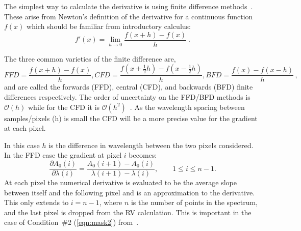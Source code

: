 The simplest way to calculate the derivative is using finite difference methods~\citep{quarteroni_numerical_2000}.
These arise from Newton's definition of the derivative for a continuous function \(f(x)\) which should be familiar from introductory calculus:
\[f'(x) = \lim_{h \to 0} \frac{f(x+h)-f(x)}{h}~.\]

The three common varieties of the finite difference are,
\begin{equation}
{FFD} = \frac{f(x+h)-f(x)}{h}, {CFD}=\frac{f(x+\frac{1}{2}h)-f(x-\frac{1}{2}h)}{h}, {BFD}=\frac{f(x)-f(x-h)}{h}\,,
\end{equation}
and are called the forwards ({FFD}), central ({CFD}), and backwards ({BFD}) finite differences respectively.
The order of uncertainty on the {FFD}/{BFD} methods is \(\mathcal{O}(h)\) while for the {CFD} it is \(\mathcal{O}({h}^{2})\)~\citep{quarteroni_numerical_2000}.
As the wavelength spacing between samples/pixels (h) is small the {CFD} will be a more precise value for the gradient at each pixel.

In this case \(h\) is the difference in wavelength between the two pixels considered.
In the {FFD} case the gradient at pixel \(i\) becomes:
\begin{equation}
\frac{\partial {A}_{0}(i)}{\partial\lambda(i)} = \frac{{A}_{0}(i+1) - {A}_{0}(i)}{\lambda(i+1)-\lambda(i)}, \hspace{2em} 1 \leq i \leq n-1.
\label{eqn:ffd_precision}
\end{equation}
At each pixel the numerical derivative is evaluated to be the average slope between itself and the following pixel and is an approximation to the derivative.
This only extends to \(i= n-1\), where \(n\) is the number of points in the spectrum, and the last pixel is dropped from the {RV} calculation.
This is important in the case of Condition~\#2 (\cref{eqn:mask2}) from~\citet{figueira_radial_2016}.


